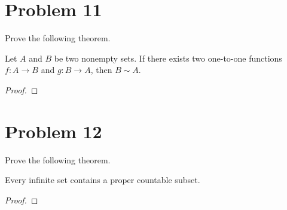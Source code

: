\documentclass[11pt,a4paper]{article}
\begin{document}
\section{Problem 11} Prove the following theorem.
\begin{theorem}
    Let \( A  \) and \( B  \) be two nonempty sets. If there exists two one-to-one functions \( f: A \to B  \) and \( g: B \to A  \), then \( B \sim A  \).
\end{theorem}
\begin{proof}

\end{proof}

\section{Problem 12} Prove the following theorem.

\begin{theorem}[ ]
    Every infinite set contains a proper countable subset.
\end{theorem}
\begin{proof}

\end{proof}
\end{document}
